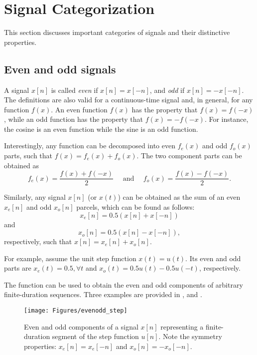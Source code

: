 \section{Signal Categorization}
\label{sec:signal_categorization}

This section discusses important categories of signals and their distinctive properties.

\subsection{Even and odd signals}
\label{sec:even_odd}

A signal $x[n]$ is called \emph{even} if $x[n]=x[-n]$, and \emph{odd} if $x[n]=-x[-n]$. The definitions are also valid for a continuous-time signal and, in general, for any function $f(x)$. An even function $f(x)$ has the property that $f(x) = f(-x)$, while an odd function has the property that $f(x)=-f(-x)$. For instance, the cosine is an even function while the sine is an odd function.

Interestingly, any function can be decomposed into  even $f_e(x)$ and odd $f_o(x)$ parts, such that $f(x) = f_e(x) + f_o(x)$.  
The two component parts can be obtained as
\[
f_e(x) = \frac  {f(x) + f(-x)} 2
\textrm{~~~~and~~~~}
f_o(x) = \frac  {f(x) - f(-x)} 2.
\]

Similarly, any signal $x[n]$ (or $x(t)$) can be obtained as the sum of an even $x_e[n]$ and odd $x_o[n]$ parcels, which can be found as follows:
\begin{equation}
x_e [n] = 0.5 (x[n]+x[-n])
\label{eq:evenParcel}
\end{equation}
and
\begin{equation}
x_o [n] = 0.5 (x[n]-x[-n]),
\label{eq:oddParcel}
\end{equation}
respectively, such that $x[n] = x_e[n] + x_o[n]$.

For example, assume the unit step function $x(t)=u(t)$. Its even and odd parts are $x_e(t)=0.5, \forall t$ and $x_o(t)=0.5u(t)-0.5u(-t)$, respectively.

The function  can be used to obtain the even and odd components of arbitrary finite-duration sequences. Three examples are provided in ,  and .

\begin{figure}
	\centering
		\texttt{[image: Figures/evenodd\_step]}		
	\caption{Even and odd components of a signal $x[n]$ representing a finite-duration segment of the step function $u[n]$. Note the symmetry properties: $x_e[n]=x_e[-n]$ and $x_o[n]=-x_o[-n]$.\label{fig:evenodd_step}}
\end{figure}

